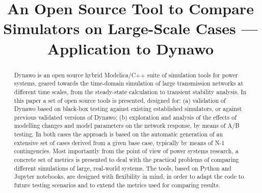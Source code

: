 \documentclass[conference]{IEEEtran}
\begin{document}

\title{An Open Source Tool to Compare Simulators on Large-Scale Cases
  --- Application to Dynawo}

\author{
}

\maketitle

\begin{abstract}
  Dynawo is an open source hybrid Modelica/C++ suite of simulation tools for
  power systems, geared towards the time-domain simulation of large transmission
  networks at different time scales, from the steady-state calculation to
  transient stability analysis. In this paper a set of open source tools is
  presented, designed for: (a) validation of Dynawo based on black-box testing
  against existing established simulators, or against previous validated
  versions of Dynawo; (b) exploration and analysis of the effects of modelling
  changes and model parameters on the network response, by means of A/B
  testing. In both cases the approach is based on the automatic generation of an
  extensive set of cases derived from a given base case, typically by means of
  N-1 contingencies. Most importantly from the point of view of power systems
  research, a concrete set of metrics is presented to deal with the practical
  problems of comparing different simulations of large, real-world systems. The
  tools, based on Python and Jupyter notebooks, are designed with flexibility in
  mind, in order to adapt the code to future testing scenarios and to extend the
  metrics used for comparing results.
\end{abstract}
\end{document}
